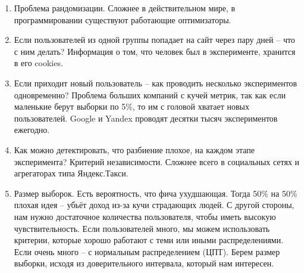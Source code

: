 
\begin{enumerate}
    \item Проблема рандомизации. Сложнее в действительном мире, в программировании существуют работающие оптимизаторы.
    
    \item Если пользователей из одной группы попадает на сайт через пару дней -- что с ним делать? Информация о том, что человек был в эксперименте, хранится в его cookies. 
    
    \item Если приходит новый пользователь -- как проводить несколько экспериментов одновременно? Проблема больших компаний с кучей метрик, так как если маленькие берут выборки по 5\%, то им с головой хватает новых пользователей. Google и Yandex проводят десятки тысяч экспериментов ежегодно.
    
    \item Как можно детектировать, что разбиение плохое, на каждом этапе эксперимента? Критерий независимости. Сложнее всего в социальных сетях и агрегаторах типа Яндекс.Такси.
    
    \item Размер выборок. Есть вероятность, что фича ухудшающая. Тогда 50\% на 50\% плохая идея -- убьёт доход из-за кучи страдающих людей. С другой стороны, нам нужно достаточное количества пользователя, чтобы иметь высокую чувствительность. Если пользователей много, мы можем использовать критерии, которые хорошо работают с теми или иными распределениями. Если очень много -- с нормальным распределением (ЦПТ). Берем размер выборки, исходя из доверительного интервала, который нам интересен. 
    
\end{enumerate}
